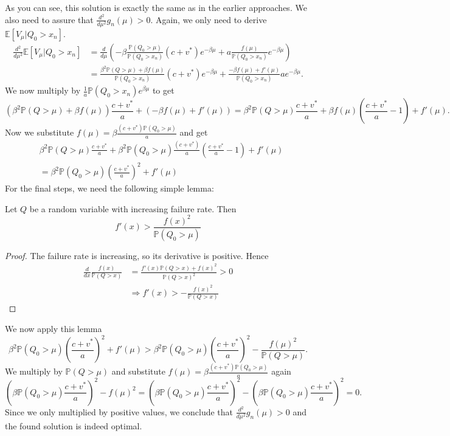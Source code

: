 As you can see, this solution is exactly the same as in the earlier approaches.
We also need to assure that $\frac{d^2}{d\mu^2}g_n(\mu)>0$.
Again, we only need to derive $\mathbb{E}[V_\mu|Q_0>x_n]$.
\begin{equation}
\begin{split}
\frac{d^2}{d\mu^2}\mathbb{E}[V_\mu|Q_0>x_n]&=\frac{d}{d\mu}(-\beta\frac{\mathbb{P}(Q_0>\mu)}{\mathbb{P}(Q_0>x_n)}(c+v^*)e^{-\beta\mu}+a \frac{f(\mu)}{\mathbb{P}(Q_0>x_n)}e^{-\beta\mu})\\
&=\frac{\beta^2\mathbb{P}(Q>\mu)+\beta f(\mu)}{\mathbb{P}(Q_0>x_n)}(c+v^*)e^{-\beta\mu}+\frac{-\beta f(\mu)+f'(\mu)}{\mathbb{P}(Q_0>x_n)}ae^{-\beta\mu}.
\end{split}
\end{equation}
We now multiply by $\frac{1}{a}\mathbb{P}(Q_0>x_n)e^{\beta\mu}$ to get
$$
(\beta^2\mathbb{P}(Q>\mu)+\beta f(\mu))\frac{c+v^*}{a}+(-\beta f(\mu)+f'(\mu))=\beta^2\mathbb{P}(Q>\mu)\frac{c+v^*}{a}+\beta f(\mu)(\frac{c+v^*}{a}-1)+f'(\mu).
$$
Now we substitute $f(\mu)=\beta\frac{(c+v^*)\mathbb{P}(Q_0>\mu)}{a}$ and get
\begin{equation}
\begin{split}
&\beta^2\mathbb{P}(Q>\mu)\frac{c+v^*}{a}+\beta^2\mathbb{P}(Q_0>\mu)\frac{(c+v^*)}{a}(\frac{c+v^*}{a}-1)+f'(\mu)\\
&=\beta^2\mathbb{P}(Q_0>\mu)(\frac{c+v^*}{a})^2+f'(\mu)
\end{split}
\end{equation}
For the final steps, we need the following simple lemma:
\begin{lemma}
Let $Q$ be a random variable with increasing failure rate.
Then 
$$f'(x)>\frac{f(x)^2}{\mathbb{P}(Q_0>\mu)}$$
\end{lemma}
\begin{proof}
The failure rate is increasing, so its derivative is positive.
Hence
\begin{equation}
\begin{split}
\frac{d}{dx}\frac{f(x)}{\mathbb{P}(Q>x)}&=\frac{f'(x)\mathbb{P}(Q>x)+f(x)^2}{\mathbb{P}(Q>x)^2}>0\\
&\Rightarrow f'(x)>-\frac{f(x)^2}{\mathbb{P}(Q>x)}
\end{split}
\end{equation}
\end{proof}
We now apply this lemma
$$
\beta^2\mathbb{P}(Q_0>\mu)(\frac{c+v^*}{a})^2+f'(\mu)>\beta^2\mathbb{P}(Q_0>\mu)(\frac{c+v^*}{a})^2-\frac{f(\mu)^2}{\mathbb{P}(Q>\mu)}.
$$
We multiply by $\mathbb{P}(Q>\mu)$ and substitute $f(\mu)=\beta\frac{(c+v^*)\mathbb{P}(Q_0>\mu)}{a}$ again
\begin{equation}
\left(\beta\mathbb{P}(Q_0>\mu)\frac{c+v^*}{a}\right)^2-f(\mu)^2=\left(\beta\mathbb{P}(Q_0>\mu)\frac{c+v^*}{a}\right)^2-\left(\beta\mathbb{P}(Q_0>\mu)\frac{c+v^*}{a}\right)^2=0.
\end{equation}
Since we only multiplied by positive values, we conclude that $\frac{d^2}{d\mu^2}g_n(\mu)>0$ and the found solution is indeed optimal.

